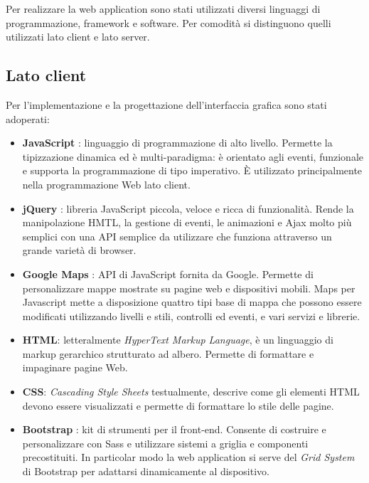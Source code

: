 Per realizzare la web application sono stati utilizzati diversi linguaggi di programmazione, framework e software. Per comodità si distinguono quelli utilizzati lato client e lato server. 

\subsection{Lato client}

Per l'implementazione e la progettazione dell'interfaccia grafica sono stati adoperati:

\begin{itemize}
    
\item
\textbf{JavaScript} \cite{JS}: linguaggio di programmazione di alto livello. Permette la tipizzazione dinamica ed è multi-paradigma: è orientato agli eventi, funzionale e supporta la programmazione di tipo imperativo. È utilizzato principalmente nella programmazione Web lato client.
    
\item
\textbf{jQuery} \cite{jQuery}: libreria JavaScript piccola, veloce e ricca di funzionalità. Rende la manipolazione HMTL, la gestione di eventi, le animazioni e Ajax molto più semplici con una API semplice da utilizzare che funziona attraverso un grande varietà di browser.
    
\item
\textbf{Google Maps} \cite{GoogleMaps}: API di JavaScript fornita da Google. Permette di personalizzare mappe mostrate su pagine web e dispositivi mobili. Maps per Javascript mette a disposizione quattro tipi base di mappa che possono essere modificati utilizzando livelli e stili, controlli ed eventi, e vari servizi e librerie.
    
\item
\textbf{HTML}: letteralmente \emph{HyperText Markup Language}, è un linguaggio di markup gerarchico strutturato ad albero. Permette di formattare e impaginare pagine Web.
    
\item
\textbf{CSS}: \emph{Cascading Style Sheets} testualmente, descrive come gli elementi HTML devono essere visualizzati e permette di formattare lo stile delle pagine.

\item
\textbf{Bootstrap} \cite{Bootstrap}: kit di strumenti per il front-end. Consente di costruire e personalizzare con Sass e utilizzare sistemi a griglia e componenti precostituiti.
In particolar modo la web application si serve del \emph{Grid System} di Bootstrap per adattarsi dinamicamente al dispositivo.

\end{itemize}


